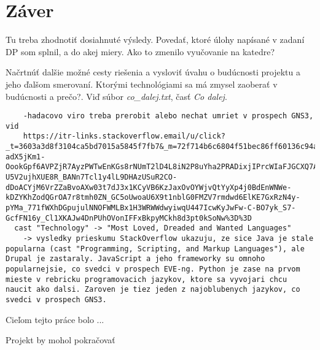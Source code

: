 \chapter{Záver}

Tu treba zhodnotiť dosiahnuté výsledy. Povedať, ktoré úlohy napísané v zadaní DP som splnil, a do akej miery. Ako to zmenilo vyučovanie na katedre?

Načrtnúť dalšie možné cesty riešenia a vysloviť úvahu o budúcnosti projektu a jeho ďalšom smerovaní. Ktorými technológiami sa má zmysel zaoberať v budúcnosti a prečo?. Viď súbor \emph{co\_dalej.txt}, časť \emph{Co dalej}.

\begin{verbatim}
    -hadacovo viro treba prerobit alebo nechat umriet v prospech GNS3, vid
    https://itr-links.stackoverflow.email/u/click?_t=3603a3d8f3104ca5bd7015a5845f7fb7&_m=72f714b6c6804f51bec86ff60136c94a&_e=khSYWjE_zs7-adX5jKm1-OookGpf6AVPZjR7AyzPWTwEnKGs8rNUmT2lD4L8iN2P8uYha2PRADixjIPrcWIaFJGCXQ7AyX0cYfKArrRAGqP2_o0jr270rA-U5V2ujhXUE8R_BANn7Tcl1y4lL9DHAzUSuR2CO-dDoACYjM6VrZZaBvoAXw03t7dJ3x1KCyVB6KzJaxOvOYWjvQtYyXp4j0BdEnWNWe-kDZYKhZodQGrOA7r8tmh0ZN_GC5oUwoaU6X9t1nblG0FMZV7rmdwd6ElKE7GxRzN4y-pYMa_771fWXhDGpujulNNOFWMLBx1H3WRWWdwyiwqU447IcwKyJwFw-C-BO7yk_S7-GcfFN16y_Cl1XKAJw4DnPUhOVonIFFxBkpyMCkh8d3pt0kSoNw%3D%3D
  cast "Technology" -> "Most Loved, Dreaded and Wanted Languages"
    -> vysledky prieskumu StackOverflow ukazuju, ze sice Java je stale popularna (cast "Programming, Scripting, and Markup Languages"), ale Drupal je zastaraly. JavaScript a jeho frameworky su omnoho popularnejsie, co svedci v prospech EVE-ng. Python je zase na prvom mieste v rebricku programovacich jazykov, ktore sa vyvojari chcu naucit ako dalsi. Zaroven je tiez jeden z najoblubenych jazykov, co svedci v prospech GNS3.
\end{verbatim}






Cieľom tejto práce bolo ...



Projekt by mohol pokračovať 




